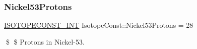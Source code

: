 \subsubsection{\texorpdfstring{Nickel53\+Protons}{Nickel53Protons}}
{\footnotesize\ttfamily \mbox{\hyperlink{group___isotope_const-_macros_ga5f18360b3e99483a35c32d789e62621c}{I\+S\+O\+T\+O\+P\+E\+C\+O\+N\+S\+T\+\_\+\+I\+NT}} Isotope\+Const\+::\+Nickel53\+Protons = 28}

\$ \$ Protons in Nickel-\/53. 